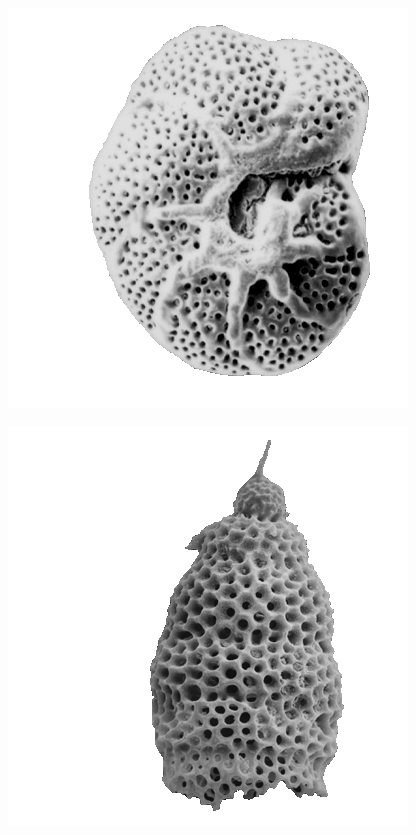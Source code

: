 \documentclass[aspectratio=169]{beamer}
\begin{document}
\begin{frame}
\begin{columns}
\begin{column}{0.1\textwidth}
\begin{center}
        \includegraphics[width=\textwidth,height=0.15\textheight,keepaspectratio=true]{figure/foram}

        \includegraphics[width=\textwidth,height=0.15\textheight,keepaspectratio=true]{figure/rad}


\end{center}
\end{column}
\end{columns}
\end{frame}
\end{document}
